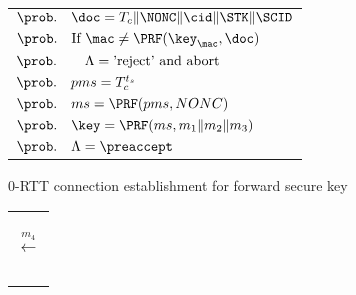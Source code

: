 \begin{figure*}[htb]
\begin{center}
{\begin{minipage}[t]{0.39\textwidth}
\begin{tabular}[c]{l}
 $\prob.\quad \doc = T_c \| \NONC \| \cid \| \STK \| \SCID$ \\
 $\prob.\quad \text{If }\mac \neq \PRF(\key_{\mac}, \doc)$ \\
 $\prob.\quad \quad \Lambda = \text{'reject' and abort}$ \\
 $\prob.\quad pms = T_c^{t_s}$ \\
 $\prob.\quad ms = \PRF(pms, NONC)$ \\
 $\prob.\quad \key = \PRF(ms, m_1 \| m_2 \| m_3)$ \\
 $\prob.\quad \Lambda = \preaccept$ \\
\end{tabular}
\end{minipage}%
} \vspace{10pt}

0-RTT connection establishment for forward secure key
\vspace{10pt}\\

\begin{minipage}[t]{0.13\textwidth}
\centering
\begin{tabular}[c]{l}
 $ $\\
 $ $\\
 $ $\\
 $\xleftarrow{m_4}$\\
 $ $\\
 $ $\\
 $ $\\
 $ $\\
 $ $\\
\end{tabular}
\end{minipage}%
 \vspace{10pt}


\end{center}
\end{figure*}
